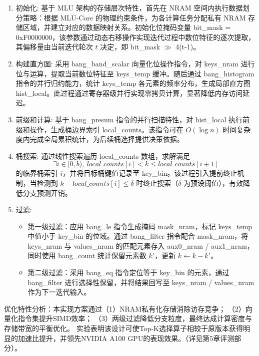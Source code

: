 \begin{enumerate}
    \item {初始化}:
    基于 MLU 架构的存储层次特性，首先在 NRAM 空间内执行数据划分策略：根据 MLU-Core 的物理约束条件，为各计算任务分配私有 NRAM 存储区域，并建立对应的数据映射关系。初始化位掩码变量 bit\_mask = 0xF0000000，该参数通过动态右移操作实现迭代过程中数位特征的逐次提取，其偏移量由当前迭代轮次 $t$ 决定，即 bit\_mask $\gg$ 4(t-1)。
    
    \item {构建直方图}:
    采用 bang\_band\_scalar 向量化位操作指令，对 keys\_nram 进行位与运算，提取当前数位特征至 keys\_temp 缓冲。随后通过 bang\_histogram 指令的并行归约能力，统计 keys\_temp 各元素的频率分布，生成局部直方图 hist\_local。此过程通过寄存器级并行实现零拷贝计算，显著降低内存访问延迟。
    
    \item {前缀和计算}:
    基于 bang\_presum 指令的并行扫描特性，对 hist\_local 执行前缀和操作，生成桶边界索引 local\_counts。该指令可在 $O(\log n)$ 时间复杂度内完成全局累积统计，为后续桶选择提供决策依据。
    
    \item {桶搜索}:
    通过线性搜索遍历 local\_counts 数组，求解满足
    \[
    \exists i \in [0,b),\ local\_counts[i] < k \leqslant local\_counts[i+1]
    \]
    的临界桶索引 $i$，并将目标桶键值记录至 key\_bin。该过程引入提前终止机制，当检测到 $k - local\_counts[i] \leqslant \delta$ 时终止搜索（$\delta$ 为预设阈值），有效降低分支预测开销。
    
    \item {过滤}:
    \begin{itemize}
    \item 第一级过滤：应用 bang\_le 指令生成掩码 mask\_nram，标记 keys\_temp 中值小于 key\_bin 的位域。通过 bang\_filter 指令配合 mask\_nram，将 keys\_nram 与 values\_nram 的匹配元素存入 aux0\_nram / aux1\_nram，同时使用 bang\_count 统计保留元素数 $k'$，更新 $k \leftarrow k - k'$。
    \item 第二级过滤：采用 bang\_eq 指令定位等于 key\_bin 的元素，通过 bang\_filter 进行选择性保留，并将结果回写至 keys\_nram / values\_nram 作为下一迭代输入。
    \end{itemize}
    \end{enumerate}
    
{优化特性分析}：本实现方案通过（1）NRAM私有化存储消除访存竞争；
（2）向量化指令集提升SIMD效率；
（3）两级过滤降低分支粒度，最终达成计算密度与存储带宽的平衡优化。
实验表明该设计可使Top-K选择算子相较于原版本获得明显的加速比提升，并领先NVIDIA A100 GPU的表现效果。（详见第5章评测部分）。

